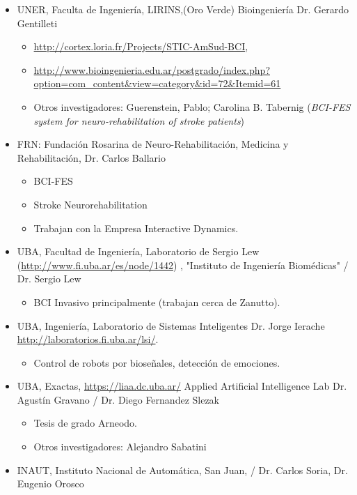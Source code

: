 \begin{itemize}
\item UNER, Faculta de Ingeniería, LIRINS,(Oro Verde) Bioingeniería  Dr. Gerardo Gentilleti
\begin{itemize}
\item \url{http://cortex.loria.fr/Projects/STIC-AmSud-BCI},
\item \url{http://www.bioingenieria.edu.ar/postgrado/index.php?option=com_content&view=category&id=72&Itemid=61}
\item Otros investigadores: Guerenstein, Pablo; Carolina B. Tabernig (\textit{BCI-FES system for neuro-rehabilitation of stroke patients})
\end{itemize}
\item FRN: Fundación Rosarina de Neuro-Rehabilitación, Medicina y Rehabilitación, Dr. Carlos Ballario
\begin{itemize}
\item BCI-FES
\item Stroke Neurorehabilitation
\item Trabajan con la Empresa Interactive Dynamics. 
\end{itemize}
\item UBA, Facultad de Ingeniería, Laboratorio de Sergio Lew (\url{http://www.fi.uba.ar/es/node/1442}) , "Instituto de Ingeniería Biomédicas" / Dr. Sergio Lew
\begin{itemize}
\item BCI Invasivo principalmente (trabajan cerca de Zanutto).
\end{itemize}
\item UBA, Ingeniería, Laboratorio de Sistemas Inteligentes Dr. Jorge Ierache \url{http://laboratorios.fi.uba.ar/lsi/}.
\begin{itemize}
\item Control de robots por bioseñales, detección de emociones.
\end{itemize}
\item UBA, Exactas, \url{https://liaa.dc.uba.ar/} Applied Artificial Intelligence Lab Dr. Agustín Gravano / Dr. Diego Fernandez Slezak
\begin{itemize}
\item Tesis de grado Arneodo.
\item Otros investigadores: Alejandro Sabatini
\end{itemize}
\item INAUT, Instituto Nacional de Automática, San Juan, / Dr. Carlos Soria, Dr. Eugenio Orosco
\begin{itemize}

\end{itemize}
\end{itemize}
